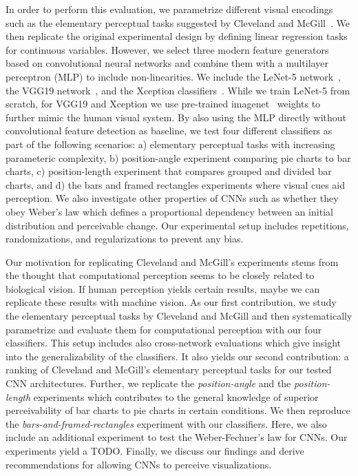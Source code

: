 In order to perform this evaluation, we parametrize different visual encodings such as the elementary perceptual tasks suggested by Cleveland and McGill~\cite{cleveland_mcgill}. We then replicate the original experimental design by defining linear regression tasks for continuous variables. However, we select three modern feature generators based on convolutional neural networks and combine them with a multilayer perceptron (MLP) to include non-linearities. We include the LeNet-5 network~\cite{lenet}, the VGG19 network~\cite{simonyan_very_deep2014}, and the Xception classifiers~\cite{xception}. While we train LeNet-5 from scratch, for VGG19 and Xception we use pre-trained imagenet~\cite{imagenet} weights to further mimic the human visual system. By also using the MLP directly without convolutional feature detection as baseline, we test four different classifiers as part of the following scenarios: a) elementary perceptual tasks with increasing parameteric complexity, b) position-angle experiment comparing pie charts to bar charts, c) position-length experiment that compares grouped and divided bar charts, and d) the bars and framed rectangles experiments where visual cues aid perception. We also investigate other properties of CNNs such as whether they obey Weber's law which defines a proportional dependency between an initial distribution and perceivable change. Our experimental setup includes repetitions, randomizations, and regularizations to prevent any bias. 

Our motivation for replicating Cleveland and McGill's experiments stems from the thought that computational perception seems to be closely related to biological vision. If human perception yields certain results, maybe we can replicate these results with machine vision. As our first contribution, we study the elementary perceptual tasks by Cleveland and McGill and then systematically parametrize and evaluate them for computational perception with our four classifiers. This setup includes also cross-network evaluations which give insight into the generalizability of the classifiers. It also yields our second contribution: a ranking of Cleveland and McGill's elementary perceptual tasks for our tested CNN architectures. Further, we replicate the \emph{position-angle} and the \emph{position-length} experiments which contributes to the general knowledge of superior perceivability of bar charts to pie charts in certain conditions. We then reproduce the \emph{bars-and-framed-rectangles} experiment with our classifiers. Here, we also include an additional experiment to test the Weber-Fechner's law for CNNs. Our experiments yield a TODO. Finally, we discuss our findings and derive recommendations for allowing CNNs to perceive visualizations.

